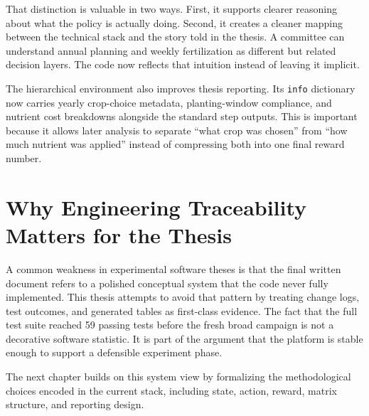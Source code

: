 That distinction is valuable in two ways. First, it supports clearer reasoning about what the policy is actually doing. Second, it creates a cleaner mapping between the technical stack and the story told in the thesis. A committee can understand annual planning and weekly fertilization as different but related decision layers. The code now reflects that intuition instead of leaving it implicit.

The hierarchical environment also improves thesis reporting. Its \texttt{info} dictionary now carries yearly crop-choice metadata, planting-window compliance, and nutrient cost breakdowns alongside the standard step outputs. This is important because it allows later analysis to separate ``what crop was chosen'' from ``how much nutrient was applied'' instead of compressing both into one final reward number.

\section{Why Engineering Traceability Matters for the Thesis}

A common weakness in experimental software theses is that the final written document refers to a polished conceptual system that the code never fully implemented. This thesis attempts to avoid that pattern by treating change logs, test outcomes, and generated tables as first-class evidence. The fact that the full test suite reached 59 passing tests before the fresh broad campaign is not a decorative software statistic. It is part of the argument that the platform is stable enough to support a defensible experiment phase.

The next chapter builds on this system view by formalizing the methodological choices encoded in the current stack, including state, action, reward, matrix structure, and reporting design.
